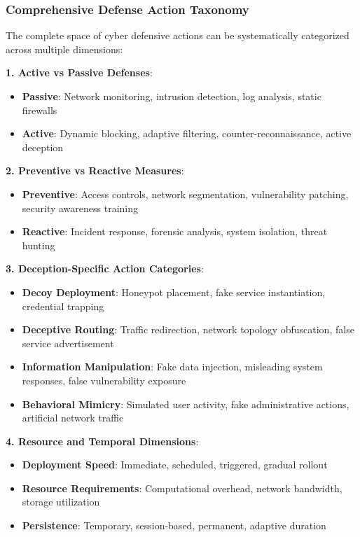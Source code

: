 \documentclass[12pt,oneside,a4paper]{article}
\theoremstyle{definition}
\theoremstyle{plain}
\begin{document}
\subsubsection{Comprehensive Defense Action Taxonomy}

The complete space of cyber defensive actions can be systematically categorized across multiple dimensions:

\textbf{1. Active vs Passive Defenses}:
\begin{itemize}
\item \textbf{Passive}: Network monitoring, intrusion detection, log analysis, static firewalls
\item \textbf{Active}: Dynamic blocking, adaptive filtering, counter-reconnaissance, active deception
\end{itemize}

\textbf{2. Preventive vs Reactive Measures}:
\begin{itemize}
\item \textbf{Preventive}: Access controls, network segmentation, vulnerability patching, security awareness training
\item \textbf{Reactive}: Incident response, forensic analysis, system isolation, threat hunting
\end{itemize}

\textbf{3. Deception-Specific Action Categories}:
\begin{itemize}
\item \textbf{Decoy Deployment}: Honeypot placement, fake service instantiation, credential trapping
\item \textbf{Deceptive Routing}: Traffic redirection, network topology obfuscation, false service advertisement
\item \textbf{Information Manipulation}: Fake data injection, misleading system responses, false vulnerability exposure
\item \textbf{Behavioral Mimicry}: Simulated user activity, fake administrative actions, artificial network traffic
\end{itemize}

\textbf{4. Resource and Temporal Dimensions}:
\begin{itemize}
\item \textbf{Deployment Speed}: Immediate, scheduled, triggered, gradual rollout
\item \textbf{Resource Requirements}: Computational overhead, network bandwidth, storage utilization
\item \textbf{Persistence}: Temporary, session-based, permanent, adaptive duration
\end{itemize}
\end{document}
